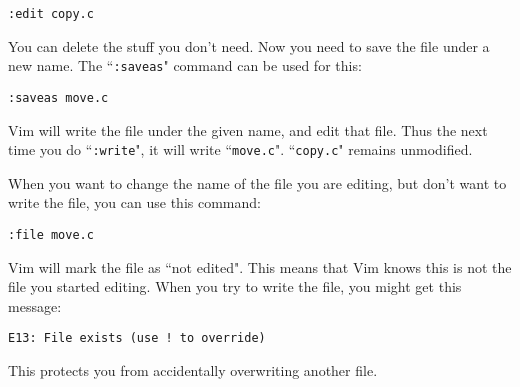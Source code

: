  \begin{Verbatim}[samepage=true]
 :edit copy.c
 \end{Verbatim}

You can delete the stuff you don't need.
Now you need to save the file under a new name.
The ``\texttt{:saveas}" command can be used for this:

 \begin{Verbatim}[samepage=true]
 :saveas move.c
 \end{Verbatim}

Vim will write the file under the given name, and edit that file.
Thus the next time you do ``\texttt{:write}", it will write ``\texttt{move.c}".
``\texttt{copy.c}" remains unmodified.

When you want to change the name of the file you are editing, but don't want to write the file, you can use this command:

 \begin{Verbatim}[samepage=true]
 :file move.c
 \end{Verbatim}

Vim will mark the file as ``not edited".
This means that Vim knows this is not the file you started editing.
When you try to write the file, you might get this message:

\begin{Verbatim}[samepage=true]
    E13: File exists (use ! to override) 
\end{Verbatim}

This protects you from accidentally overwriting another file.
\clearpage
